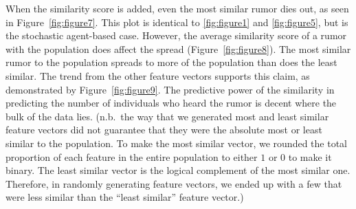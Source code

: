 When the similarity score is added, even the most similar rumor dies out, as seen in Figure~\ref{fig:figure7}.
This plot is identical to \ref{fig:figure1} and \ref{fig:figure5}, but is the stochastic agent-based case.
However, the average similarity score of a rumor with the population does affect the spread (Figure~\ref{fig:figure8}).
The most similar rumor to the population spreads to more of the population than does the least similar.
The trend from the other feature vectors supports this claim, as demonstrated by Figure~\ref{fig:figure9}.
The predictive power of the similarity in predicting the number of individuals who heard the rumor is decent where the bulk of the data lies.
(n.b.\ the way that we generated most and least similar feature vectors did not guarantee that they were the absolute most or least similar to the population.
To make the most similar vector, we rounded the total proportion of each feature in the entire population to either $ 1 $ or $ 0 $ to make it binary.
The least similar vector is the logical complement of the most similar one.
Therefore, in randomly generating feature vectors, we ended up with a few that were less similar than the ``least similar'' feature vector.)
